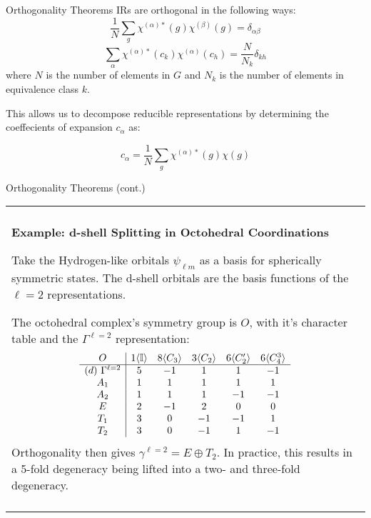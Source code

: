 \documentclass[11pt]{beamer}
\newenvironment{boxed2}
    {\begin{center}
    \begin{tabular}{|p{0.95\textwidth}|}
    \hline\\
    }
    { 
    \\\\\hline
    \end{tabular} 
    \end{center}
    }
\begin{document}
\begin{frame}{Orthogonality Theorems}
	IRs are orthogonal in the following ways:
	$$
	\frac{1}{N}\sum_{g}\chi^{(\alpha)*}(g)\chi^{(\beta)}(g) = \delta_{\alpha\beta}
	$$
	$$
	\sum_{\alpha}\chi^{(\alpha)*}(c_k)\chi^{(\alpha)}(c_h)= \frac{N}{N_k}\delta_{kh}
	$$
	where $N$ is the number of elements in $G$ and $N_k$ is the number of elements in equivalence class $k$.
	
	\medskip
	
	This allows us to decompose reducible representations by determining the coeffecients of expansion $c_{\alpha}$ as:
	
	$$
	c_{\alpha} = \frac{1}{N}\sum_{g}\chi^{(\alpha)*}(g)\chi(g)
	$$ 
\end{frame}

\begin{frame}{Orthogonality Theorems (cont.) }
	\small
\begin{boxed2}
	
	\vspace{-.41cm}
	
	\textbf{Example: d-shell Splitting in Octohedral Coordinations} 
	
	Take the Hydrogen-like orbitals $\psi_{\ell m}$ as a basis for spherically symmetric states. The d-shell orbitals are the basis functions of the $\ell=2$ representations.
	
	\medskip
	
	The octohedral complex's symmetry group is $O$, with it's character table and the $\Gamma^{\ell=2}$ representation:
	$$
	\begin{array}{c|c c c c c}
		O & 1\langle \mathbb{I}\rangle  & 8\langle C_3\rangle  & 3\langle C_2\rangle  & 6\langle C_2'\rangle & 6\langle C_4^3\rangle \\
		\hline 
		(d)\ \Gamma^{\ell=2} & 5 & -1 & 1 & 1 & -1 \\
		A_1 & 1 &  1&  1&  1&  1\\
		A_2 & 1&  1&  1&  -1&  -1\\
		E & 2 & -1 & 2 & 0 & 0 \\
		T_1 & 3 & 0 & -1 & -1 &1\\
		T_2 & 3 & 0 & -1 & 1 &-1\\
	\end{array}
	$$
	Orthogonality then gives $\gamma^{\ell=2}=E\oplus T_2$. In practice, this results in a 5-fold degeneracy being lifted into a two- and three-fold degeneracy.
	
	\vspace{-.3cm}
	
\end{boxed2}
\end{frame}
\end{document}
